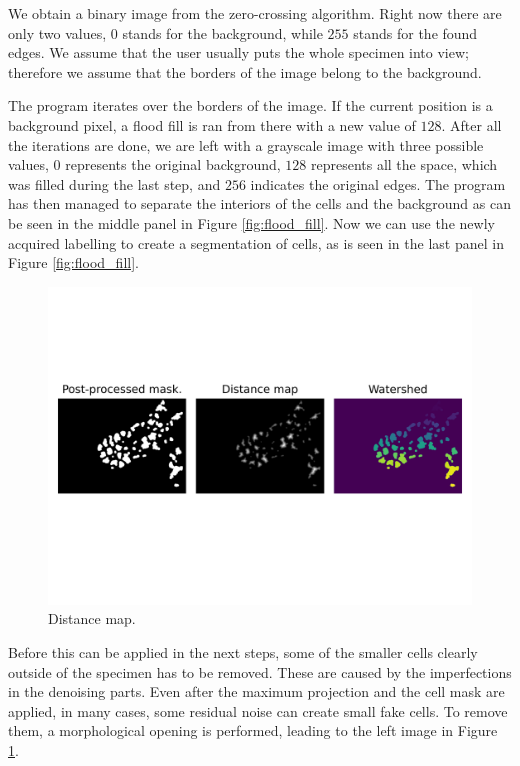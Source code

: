\documentclass[
  digital,     %
  oneside,     %
  nosansbold,  %
  nocolorbold, %
  lof,         %
  lot,         %
]{fithesis4}
\begin{document}
We obtain a binary image from the zero-crossing algorithm. Right now there are
only two values, $0$ stands for the background, while $255$ stands for the found
edges. We assume that the user usually puts the whole specimen into view;
therefore we assume that the borders of the image belong to the background.

The program iterates over the borders of the image. If the current position is
a background pixel, a flood fill is ran from there with a new value of $128$.
After all the iterations are done, we are left with a grayscale
image with three possible values, $0$ represents the original background, $128$
represents all the space, which was filled during the last step, and $256$
indicates the original edges. The program has then managed to separate the interiors of
the cells and the background as can be seen in the middle panel in Figure %
\ref{fig:flood_fill}. Now we can use the newly acquired labelling to create a
segmentation of cells, as is seen in the last panel in Figure \ref{fig:flood_fill}. %

\begin{figure}
    \begin{center}
        \includegraphics[width=\linewidth]{resources/distance_map.png}
    \end{center}
    \caption{Distance map.}
    \label{fig:distance_map}
\end{figure}

Before this can be applied in the next steps, some of the smaller cells clearly
outside of the specimen has to be removed. These are caused by the imperfections
in the denoising parts. Even after the maximum projection and the cell mask are
applied, in many cases, some residual noise can create small fake cells. To
remove them, a morphological opening is performed, leading to the left image in
Figure \ref{fig:distance_map}.
\end{document}
